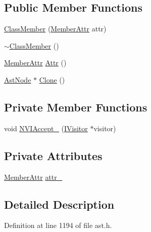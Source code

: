 \subsection*{Public Member Functions}
\begin{DoxyCompactItemize}
\item 
\hyperlink{classmocha_1_1_class_member_a66371f92f430a4c207ab9431753853b3}{ClassMember} (\hyperlink{classmocha_1_1_class_member_a3b8ac727565cfee0a488ff72a692315c}{MemberAttr} attr)
\item 
\hyperlink{classmocha_1_1_class_member_ac44d3de151002e94d91ebc62f2fa4d7e}{$\sim$ClassMember} ()
\item 
\hyperlink{classmocha_1_1_class_member_a3b8ac727565cfee0a488ff72a692315c}{MemberAttr} \hyperlink{classmocha_1_1_class_member_a67bde775e5f9aac233c5b163cc3b78d3}{Attr} ()
\item 
\hyperlink{classmocha_1_1_ast_node}{AstNode} $\ast$ \hyperlink{classmocha_1_1_class_member_aae2611eb97d6be3e41805c2ddabc6c5b}{Clone} ()
\end{DoxyCompactItemize}
\subsection*{Private Member Functions}
\begin{DoxyCompactItemize}
\item 
void \hyperlink{classmocha_1_1_class_member_af42df5d8b90e907a75df5a12408d1973}{NVIAccept\_\-} (\hyperlink{classmocha_1_1_i_visitor}{IVisitor} $\ast$visitor)
\end{DoxyCompactItemize}
\subsection*{Private Attributes}
\begin{DoxyCompactItemize}
\item 
\hyperlink{classmocha_1_1_class_member_a3b8ac727565cfee0a488ff72a692315c}{MemberAttr} \hyperlink{classmocha_1_1_class_member_ad64f0157c5feb19535d7e22fc2a46306}{attr\_\-}
\end{DoxyCompactItemize}


\subsection{Detailed Description}


Definition at line 1194 of file ast.h.



